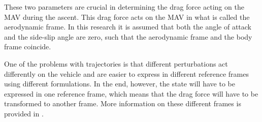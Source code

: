 \noindent
These two parameters are crucial in determining the drag force acting on the \ac{MAV} during the ascent. This drag force acts on the \ac{MAV} in what is called the aerodynamic frame. In this research it is assumed that both the angle of attack and the side-slip angle are zero, such that the aerodynamic frame and the body frame coincide.

One of the problems with trajectories is that different perturbations act differently on the vehicle and are easier to express in different reference frames using different formulations. In the end, however, the state will have to be expressed in one reference frame, which means that the drag force will have to be transformed to another frame. More information on these different frames is provided in .




